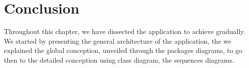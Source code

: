 
    \pagebreak
	\clearpage
	\newpage
	\section{Conclusion}
	Throughout this chapter, we have dissected the application to achieve gradually.
	We started by presenting the general architecture of the application, the we explained the global conception, unveiled through the packages diagrams, to go then to the detailed conception using class diagram, the sequences diagrams.  
	
